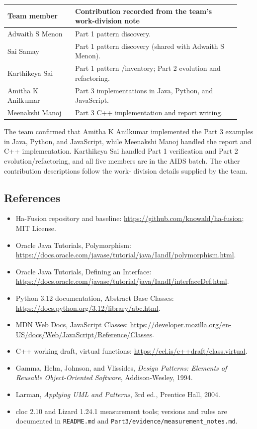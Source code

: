 \documentclass[11pt,a4paper]{article}
\newcommand{\code}[1]{\texttt{\small #1}}
\begin{document}
\begin{longtable}{p{0.27\linewidth}p{0.66\linewidth}}
\toprule
Team member & Contribution recorded from the team's work-division note \\
\midrule
\endhead
Adwaith S Menon & Part 1 pattern discovery. \\
Sai Samay & Part 1 pattern discovery (shared with Adwaith S Menon). \\
Karthikeya Sai & Part 1 pattern /inventory; Part 2 evolution and refactoring. \\
Amitha K Anilkumar & Part 3 implementations in Java, Python, and JavaScript. \\
Meenakshi Manoj & Part 3 C++ implementation and report writing. \\
\bottomrule
\end{longtable}

The team confirmed that Amitha K Anilkumar implemented the Part 3 examples in
Java, Python, and JavaScript, while Meenakshi Manoj handled the report and C++
implementation. Karthikeya Sai handled Part 1 verification and Part 2 evolution/refactoring, and all five members
are in the AIDS batch. The other contribution descriptions follow the work-
division details supplied by the team.

\subsection{References}
\begin{itemize}[nosep]
\item Ha-Fusion repository and baseline: \url{https://github.com/knowald/ha-fusion}; MIT License.
\item Oracle Java Tutorials, Polymorphism: \url{https://docs.oracle.com/javase/tutorial/java/IandI/polymorphism.html}.
\item Oracle Java Tutorials, Defining an Interface: \url{https://docs.oracle.com/javase/tutorial/java/IandI/interfaceDef.html}.
\item Python 3.12 documentation, Abstract Base Classes: \url{https://docs.python.org/3.12/library/abc.html}.
\item MDN Web Docs, JavaScript Classes: \url{https://developer.mozilla.org/en-US/docs/Web/JavaScript/Reference/Classes}.
\item C++ working draft, virtual functions: \url{https://eel.is/c++draft/class.virtual}.
\item Gamma, Helm, Johnson, and Vlissides, \textit{Design Patterns: Elements of Reusable Object-Oriented Software}, Addison-Wesley, 1994.
\item Larman, \textit{Applying UML and Patterns}, 3rd ed., Prentice Hall, 2004.
\item cloc 2.10 and Lizard 1.24.1 measurement tools; versions and rules are documented in \code{README.md} and \code{Part3/evidence/measurement\_notes.md}.
\end{itemize}
\end{document}
